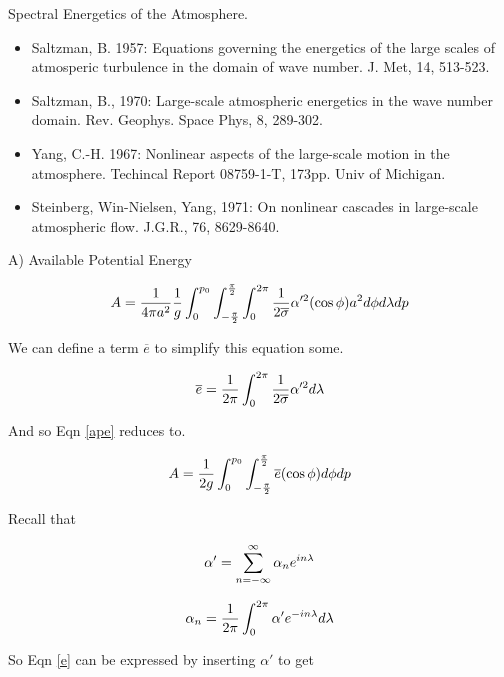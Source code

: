 \documentclass{article}
\begin{document}
Spectral Energetics of the Atmosphere.

\begin{itemize}

\item Saltzman, B. 1957: Equations governing the energetics of the large scales of atmosperic turbulence in the domain of wave number. J. Met, 14, 513-523.

\item Saltzman, B., 1970: Large-scale atmospheric energetics in the wave number domain.  Rev. Geophys. Space Phys, 8, 289-302.

\item Yang, C.-H. 1967: Nonlinear aspects of the large-scale motion in the atmosphere.  Techincal Report 08759-1-T, 173pp.  Univ of Michigan.

\item Steinberg, Win-Nielsen, Yang, 1971: On nonlinear cascades in large-scale atmospheric flow.  J.G.R., 76, 8629-8640.

\end{itemize}

A) Available Potential Energy

\begin{equation}
A = \frac{1}{4 \pi a^2}\frac{1}{g} \int_{0}^{p_0} \int_{-\frac{\pi}{2}}^{\frac{\pi}{2}} \int_{0}^{2\pi} \frac{1}{2\overline{\sigma}} \alpha'^2 (\cos{\phi}) a^2 d\phi d\lambda dp
\label{ape}
\end{equation}

We can define a term $\overline{e}$ to simplify this equation some.

\begin{equation}
\overline{e} = \frac{1}{2\pi} \int_{0}^{2\pi} \frac{1}{2\overline{\sigma}} \alpha'^2 d\lambda
\label{e}
\end{equation}

And so Eqn \ref{ape} reduces to.

\begin{equation}
A = \frac{1}{2g} \int_{0}^{p_0} \int_{-\frac{\pi}{2}}^{\frac{\pi}{2}} \overline{e} (\cos{\phi}) d\phi dp
\end{equation}

Recall that

\begin{equation}
\alpha' = \sum_{n=-\infty}^{\infty} \alpha_n e^{in\lambda}
\label{alphaprime}
\end{equation}

\begin{equation}
\alpha_n = \frac{1}{2\pi} \int_{0}^{2\pi} \alpha' e^{-in\lambda} d\lambda
\label{alphan}
\end{equation}

So Eqn \ref{e} can be expressed by inserting $\alpha'$ to get
\end{document}
